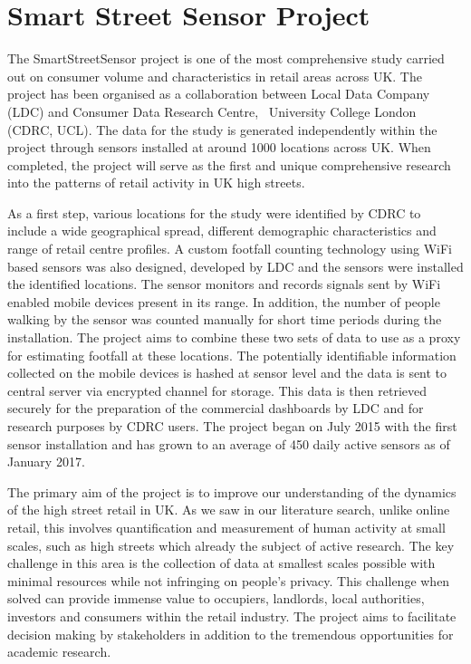 \section{Smart Street Sensor Project}

The SmartStreetSensor project is one of the most comprehensive study carried out on consumer volume and characteristics in retail areas across UK. The project has been organised as a collaboration between Local Data Company (LDC) and Consumer Data Research Centre,  University College London (CDRC, UCL). The data for the study is generated independently within the project through sensors installed at around 1000 locations across UK. When completed, the project will serve as the first and unique comprehensive research into the patterns of retail activity in UK high streets.

As a first step, various locations for the study were identified by CDRC to include a wide geographical spread, different demographic characteristics and range of retail centre profiles. A custom footfall counting technology using WiFi based sensors was also designed, developed by LDC and the sensors were installed the identified locations. The sensor monitors and records signals sent by WiFi enabled mobile devices present in its range. In addition, the number of people walking by the sensor was counted manually for short time periods during the installation. The project aims to combine these two sets of data to use as a proxy for estimating footfall at these locations. The potentially identifiable information collected on the mobile devices is hashed at sensor level and the data is sent to central server via encrypted channel for storage. This data is then retrieved securely for the preparation of the commercial dashboards by LDC and for research purposes by CDRC users. The project began on July 2015 with the first sensor installation and has grown to an average of 450 daily active sensors as of January 2017.

The primary aim of the project is to improve our understanding of the dynamics of the high street retail in UK. As we saw in our literature search, unlike online retail, this involves quantification and measurement of human activity at small scales, such as high streets which already the subject of active research. The key challenge in this area is the collection of data at smallest scales possible with minimal resources while not infringing on people’s privacy. This challenge when solved can provide immense value to occupiers, landlords, local authorities, investors and consumers within the retail industry. The project aims to facilitate decision making by stakeholders in addition to the tremendous opportunities for academic research.



